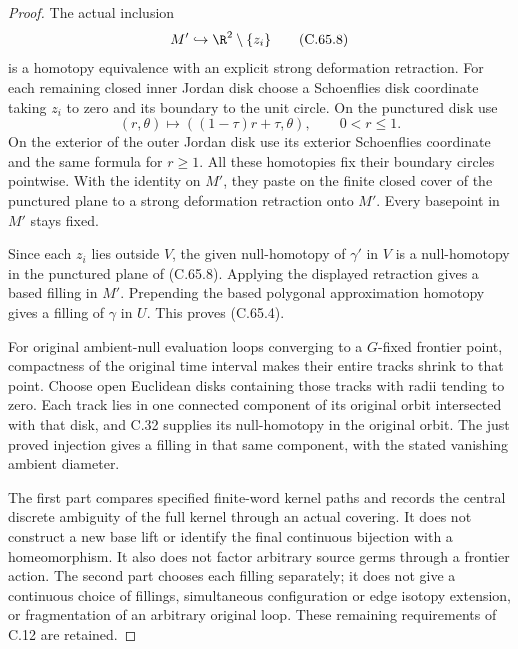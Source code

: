 \begin{proof}
The actual inclusion
\[
                  M'\hookrightarrow\R^2\setminus\{z_i\}
                                                               \tag{C.65.8}
\]
is a homotopy equivalence with an
explicit strong deformation retraction.
For each remaining closed inner Jordan
disk choose a Schoenflies disk coordinate
taking $z_i$ to zero and its boundary
to the unit circle. On the punctured
disk use
\[
        (r,\theta)\longmapsto((1-\tau)r+\tau,\theta),
                   \qquad 0<r\leq1.                    \tag{C.65.9}
\]
On the exterior of the outer Jordan
disk use its exterior Schoenflies
coordinate and the same formula for
$r\geq1$. All these homotopies fix
their boundary circles pointwise.
With the identity on $M'$, they
paste on the finite closed cover
of the punctured plane to a strong
deformation retraction onto $M'$.
Every basepoint in $M'$ stays fixed.

Since each $z_i$ lies outside $V$,
the given null-homotopy of $\gamma'$
in $V$ is a null-homotopy in the
punctured plane of (C.65.8).
Applying the displayed retraction
gives a based filling in $M'$.
Prepending the based polygonal
approximation homotopy gives a
filling of $\gamma$ in $U$.
This proves (C.65.4).

For original ambient-null evaluation loops
converging to a $G$-fixed frontier
point, compactness of the original
time interval makes their entire
tracks shrink to that point.
Choose open Euclidean disks
containing those tracks with
radii tending to zero. Each track
lies in one connected component
of its original orbit intersected
with that disk, and C.32 supplies
its null-homotopy in the original
orbit. The just proved injection
gives a filling in that same
component, with the stated
vanishing ambient diameter.

The first part compares specified
finite-word kernel paths and records
the central discrete ambiguity of the
full kernel through an actual covering.
It does not construct a new base lift
or identify the final continuous
bijection with a homeomorphism.
It also does not factor arbitrary
source germs through a frontier action.
The second part chooses each
filling separately; it does not
give a continuous choice of
fillings, simultaneous configuration
or edge isotopy extension, or
fragmentation of an arbitrary
original loop. These remaining
requirements of C.12 are retained.
\end{proof}
